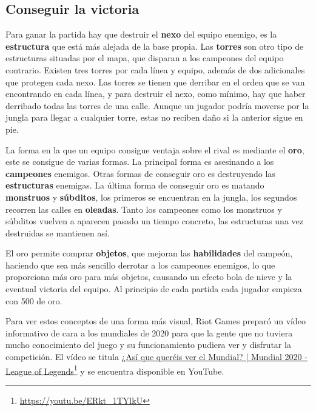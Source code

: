 \subsection{Conseguir la victoria}
Para ganar la partida hay que destruir el \textbf{nexo} del equipo enemigo, es la \textbf{estructura} que está más alejada de la base propia. Las \textbf{torres} son otro tipo de estructuras situadas por el mapa, que disparan a los campeones del equipo contrario. Existen tres torres por cada línea y equipo, además de dos adicionales que protegen cada nexo. Las torres se tienen que derribar en el orden que se van encontrando en cada línea, y para destruir el nexo, como mínimo, hay que haber derribado todas las torres de una calle. Aunque un jugador podría moverse por la jungla para llegar a cualquier torre, estas no reciben daño si la anterior sigue en pie.

La forma en la que un equipo consigue ventaja sobre el rival es mediante el \textbf{oro}, este se consigue de varias formas. La principal forma es asesinando a los \textbf{campeones} enemigos. Otras formas de conseguir oro es destruyendo las \textbf{estructuras} enemigas. La última forma de conseguir oro es matando \textbf{monstruos} y \textbf{súbditos}, los primeros se encuentran en la jungla, los segundos recorren las calles en \textbf{oleadas}. Tanto los campeones como los monstruos y súbditos vuelven a aparecen pasado un tiempo concreto, las estructuras una vez destruidas se mantienen así.

El oro permite comprar \textbf{objetos}, que mejoran las \textbf{habilidades} del campeón, haciendo que sea más sencillo derrotar a los campeones enemigos, lo que proporciona más oro para más objetos, causando un efecto bola de nieve y la eventual victoria del equipo. Al principio de cada partida cada jugador empieza con 500 de oro.

Para ver estos conceptos de una forma más visual, Riot Games preparó un vídeo informativo de cara a los mundiales de 2020 para que la gente que no tuviera mucho conocimiento del juego y su funcionamiento pudiera ver y disfrutar la competición. El vídeo se titula \href{https://www.youtube.com/watch?v=ERkt_1TYlkU}{¿Así que queréis ver el Mundial? | Mundial 2020 - League of Legends}\footnote{\url{https://youtu.be/ERkt_1TYlkU}} y se encuentra disponible en YouTube.


